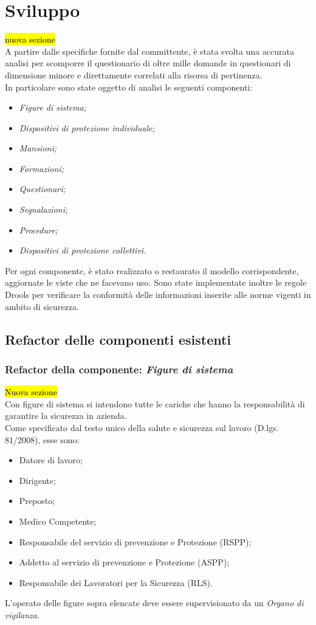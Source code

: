\section{Sviluppo}
\hl{nuova sezione} \\
A partire dalle specifiche fornite dal committente, è stata svolta una accurata analisi per scomporre il questionario di oltre mille domande in questionari di dimensione minore e direttamente correlati alla risorsa di pertinenza.\\
In particolare sono state oggetto di analisi le seguenti componenti:
\begin{itemize}
	\item \textit{Figure di sistema;}
	\item \textit{Dispositivi di protezione individuale;}
	\item \textit{Mansioni;}
	\item \textit{Formazioni;}
	\item \textit{Questionari;}
	\item \textit{Segnalazioni;}
	\item \textit{Procedure;}
	\item \textit{Dispositivi di protezione collettivi.}
\end{itemize}
Per ogni componente, è stato realizzato o restaurato il modello corrispondente, aggiornate le viste che ne facevano uso. Sono state implementate inoltre le regole Drools per verificare la conformità delle informazioni inserite alle norme vigenti in ambito di sicurezza.
\subsection{Refactor delle componenti esistenti}
	
	
\subsubsection{Refactor della componente: \textit{Figure di sistema}}
\hl{Nuova sezione}\\
	Con figure di sistema si intendono tutte le cariche che hanno la responsabilità di garantire la sicurezza in azienda. \\
	Come specificato dal testo unico della salute e sicurezza sul lavoro (D.lgs. 81/2008), esse sono: 
	\begin{itemize}
		\item Datore di lavoro;
		\item Dirigente;
		\item Preposto;
		\item Medico Competente;
		\item Responsabile del servizio di prevenzione e Protezione (RSPP);
		\item Addetto al servizio di prevenzione e Protezione (ASPP);
		\item Responsabile dei Lavoratori per la Sicurezza (RLS).
	\end{itemize}
	L'operato delle figure sopra elencate deve essere supervisionato da un \textit{Organo di vigilanza}.

